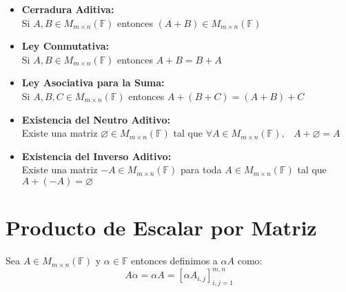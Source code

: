 \documentclass[12pt, fleqn]{report}                             %
\DeclareMathOperator \Space {\quad}                             %
\DeclareMathOperator \MiniSpace {\;}                            %
\begin{document}
                \begin{itemize}

                    \item \textbf{Cerradura Aditiva:}\\
                        Si $A, B \in M_{m \times n}(\mathbb{F})$ entonces 
                        $(A+B) \in M_{m \times n}(\mathbb{F})$


                    \item \textbf{Ley Conmutativa:}\\
                        Si $A, B \in M_{m \times n}(\mathbb{F})$ entonces $A+B = B+A$

                    \item \textbf{Ley Asociativa para la Suma:}\\
                        Si $A, B, C \in M_{m \times n}(\mathbb{F})$ entonces 
                        $A + (B+C) = (A+B) + C$

                    \item \textbf{Existencia del Neutro Aditivo:}\\
                        Existe una matriz $\varnothing \in M_{m \times n}(\mathbb{F})$
                        tal que $\forall A \in M_{m \times n}(\mathbb{F}), \MiniSpace A + \varnothing = A$

                    \item \textbf{Existencia del Inverso Aditivo:}\\
                        Existe una matriz $-A \in M_{m \times n}(\mathbb{F})$ para toda 
                        $A \in M_{m \times n}(\mathbb{F})$ tal que $ A + (-A) = \varnothing$

                \end{itemize}




        \clearpage
        \section{Producto de Escalar por Matriz}

            Sea $A \in M_{m \times n}(\mathbb{F})$ y $\alpha \in \mathbb{F}$ entonces 
            definimos a $ \alpha A$ como:
            \begin{equation}
                A \alpha = \alpha A = [\alpha A_{i, j}]_{i, j = 1}^{m, n}
            \end{equation}
\end{document}
